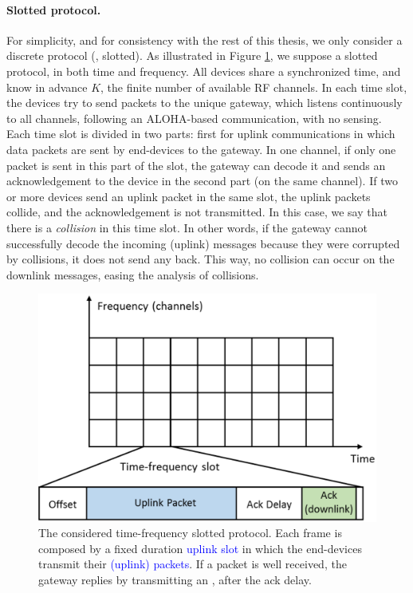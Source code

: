 \paragraph{Slotted protocol.}
%
For simplicity, and for consistency with the rest of this thesis, we only consider a discrete protocol (\ie, slotted).
As illustrated in Figure \ref{fig:41:protocol}, we suppose a slotted protocol, in both time and frequency.
All devices share a synchronized time, and know in advance $K$, the finite number of available RF channels.
In each time slot, the devices try to send packets to the unique gateway, which listens continuously to all channels, following an ALOHA-based communication, with no sensing.
Each time slot is divided in two parts: first for uplink communications in which data packets are sent by end-devices to the gateway.
In one channel, if only one packet is sent in this part of the slot, the gateway can decode it and sends an acknowledgement to the device in the second part (on the same channel).
If two or more devices send an uplink packet in the same slot, the uplink packets collide, and the acknowledgement \Ack{} is not transmitted. In this case, we say that there is a \emph{collision} in this time slot.
In other words, if the gateway cannot successfully decode the incoming (uplink) messages because they were corrupted by collisions, it does not send any \Ack{} back.
This way, no collision can occur on the downlink messages, easing the analysis of collisions.

\begin{figure}[!t]
    \centering
    \includegraphics[scale=0.40]{protocol.eps}
    \caption{The considered time-frequency slotted protocol. Each frame is composed by a fixed duration \textcolor{blue}{uplink slot} in which the end-devices transmit their \textcolor{blue}{(uplink) packets}. If a packet is well received, the gateway replies by transmitting an \textcolor{darkgreen}{\Ack}, after the ack delay.}
    \label{fig:41:protocol}
\end{figure}


